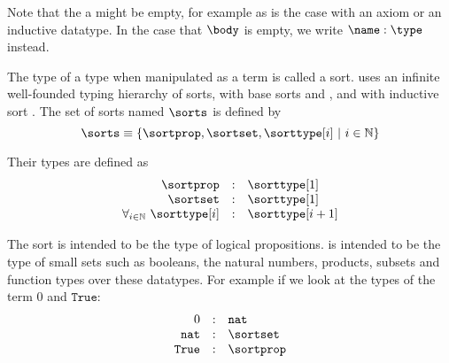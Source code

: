 Note that the a might be empty, for example as is the case with an axiom or an inductive datatype.
In the case that $\body$ is empty, we write $\name : \type$ instead.

\begin{definition}[sort]
	The type of a type when manipulated as a term is called a sort.
	\pcic uses an infinite well-founded typing hierarchy of sorts, with base sorts \sortprop and \sortset, and with inductive sort \sorttype.
	The set of sorts named $\sorts$ is defined by
	\[\sorts \equiv \{ \sortprop, \sortset, \sorttype[{i}] ~|~ i \in \mathbb{N} \} \]

	Their types are defined as
	\[
		\begin{array}{rcl}
			\sortprop & : & \sorttype[1] \\
			\sortset & : & \sorttype[1] \\
			\forall_{i \in \mathbb{N}}~ \sorttype[i] & : & \sorttype[{i+1}]
		\end{array}
	\]
\end{definition}

The sort \sortprop is intended to be the type of logical propositions.
\sortset is intended to be the type of small sets such as booleans, the natural numbers, products, subsets and function types over these datatypes.
For example if we look at the types of the term $0$ and $\texttt{True}$:
	\[
		\begin{array}{rcl}
			0 & : & \texttt{nat} \\
			\texttt{nat} & : & \sortset \\
			\texttt{True} & : & \sortprop
		\end{array}
	\]

\subsubsection{\gallina}

